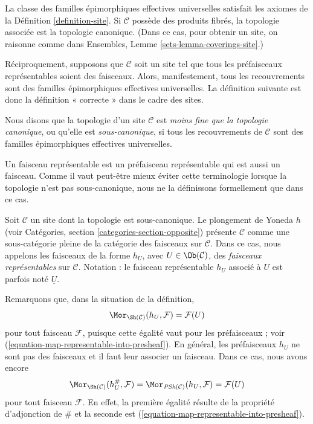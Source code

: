 \noindent
La classe des familles épimorphiques effectives universelles
satisfait les axiomes de la Définition \ref{definition-site}.
Si $\mathcal{C}$ possède des produits fibrés, la topologie associée est
la topologie canonique. (Dans ce cas, pour obtenir un site, on raisonne comme dans Ensembles,
Lemme \ref{sets-lemma-coverings-site}.)

\medskip\noindent
Réciproquement, supposons que $\mathcal{C}$ soit un site tel que
tous les préfaisceaux représentables soient des faisceaux. Alors, manifestement, tous
les recouvrements sont des familles épimorphiques effectives universelles.
La définition suivante est donc la définition « correcte » dans le
cadre des sites.

\begin{definition}
\label{definition-weaker-than-canonical}
Nous disons que la topologie d’un site $\mathcal{C}$ est
{\it moins fine que la topologie canonique}, ou qu’elle est
{\it sous-canonique}, si tous les recouvrements
de $\mathcal{C}$ sont des familles épimorphiques effectives universelles.
\end{definition}

\noindent
Un faisceau représentable est un préfaisceau représentable qui est aussi un
faisceau. Comme il vaut peut-être mieux éviter cette terminologie lorsque la
topologie n’est pas sous-canonique, nous ne la définissons formellement que dans ce cas.

\begin{definition}
\label{definition-representable-sheaf}
Soit $\mathcal{C}$ un site dont la topologie est sous-canonique.
Le plongement de Yoneda $h$ (voir
Catégories, section \ref{categories-section-opposite})
présente $\mathcal{C}$ comme une sous-catégorie pleine de la
catégorie des faisceaux sur $\mathcal{C}$. Dans ce cas,
nous appelons les faisceaux de la forme $h_U$, avec $U \in \Ob(\mathcal{C})$,
des {\it faisceaux représentables} sur $\mathcal{C}$.
Notation : le faisceau représentable $h_U$ associé à $U$ est parfois
noté {\it $\underline{U}$}.
\end{definition}

\noindent
Remarquons que, dans la situation de la définition,
$$
\Mor_{\Sh(\mathcal{C})}(h_U, \mathcal{F}) = \mathcal{F}(U)
$$
pour tout faisceau $\mathcal{F}$, puisque cette égalité vaut pour les préfaisceaux ; voir
(\ref{equation-map-representable-into-presheaf}). En général, les
préfaisceaux $h_U$ ne sont pas des faisceaux et il faut leur associer un
faisceau. Dans ce cas, nous avons encore
\begin{equation}
\label{equation-map-representable-into-sheaf}
\Mor_{\Sh(\mathcal{C})}(h_U^\#, \mathcal{F}) =
\Mor_{\textit{PSh}(\mathcal{C})}(h_U, \mathcal{F}) =
\mathcal{F}(U)
\end{equation}
pour tout faisceau $\mathcal{F}$. En effet, la première égalité résulte
de la propriété d’adjonction de $\#$ et la seconde est
(\ref{equation-map-representable-into-presheaf}).

